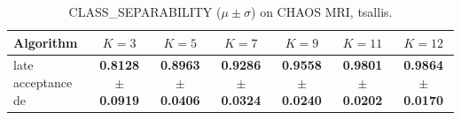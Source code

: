 \begin{table}[htbp]
\centering
\caption{CLASS_SEPARABILITY ($\mu \pm \sigma$) on CHAOS MRI, tsallis.}
\label{tab:exp2-tsallis-class_separability}
\begin{tabular}{lcccccc}
\toprule
Algorithm & $K=3$ & $K=5$ & $K=7$ & $K=9$ & $K=11$ & $K=12$ \\
\midrule
late acceptance de & \textbf{0.8128 $\pm$ 0.0919} & \textbf{0.8963 $\pm$ 0.0406} & \textbf{0.9286 $\pm$ 0.0324} & \textbf{0.9558 $\pm$ 0.0240} & \textbf{0.9801 $\pm$ 0.0202} & \textbf{0.9864 $\pm$ 0.0170} \\
\bottomrule
\end{tabular}
\end{table}